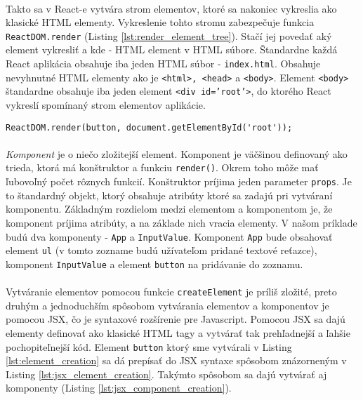 \paragraph{}
Takto sa v React-e vytvára strom elementov, ktoré sa nakoniec vykreslia ako klasické HTML elementy. Vykreslenie tohto stromu zabezpečuje funkcia \texttt{ReactDOM.render} (Listing \ref{lst:render_element_tree}). Stačí jej povedať aký element vykresliť a kde - HTML element v HTML súbore. Štandardne každá React aplikácia obsahuje iba jeden HTML súbor - \texttt{index.html}. Obsahuje nevyhnutné HTML elementy ako je \texttt{<html>, <head>} a \texttt{<body>}. Element \texttt{<body>} štandardne obsahuje iba jeden element \texttt{<div id='root'>}, do ktorého React vykreslí spomínaný strom elementov aplikácie.

\begin{lstlisting}[caption={Vykreslenie elementu do DOM}, label={lst:render_element_tree}]
ReactDOM.render(button, document.getElementById('root'));
\end{lstlisting}

\paragraph{}
\emph{Komponent} je o niečo zložitejší element. Komponent je väčšinou definovaný ako trieda, ktorá má konštruktor a funkciu \texttt{render()}. Okrem toho môže mať ľubovoľný počet rôznych funkcií. Konštruktor príjima jeden parameter \texttt{props}. Je to štandardný objekt, ktorý obsahuje atribúty ktoré sa zadajú pri vytváraní komponentu. Základným rozdielom medzi elementom a komponentom je, že komponent príjima atribúty, a na základe nich vracia elementy. V našom príklade budú dva komponenty - \texttt{App} a \texttt{InputValue}. Komponent \texttt{App} bude obsahovať element \texttt{ul} (v tomto zozname budú užívateľom pridané textové reťazce), komponent \texttt{InputValue} a element \texttt{button} na pridávanie do zoznamu.
\paragraph{}
Vytváranie elementov pomocou funkcie \texttt{createElement} je príliš zložité, preto druhým a jednoduchším spôsobom vytvárania elementov a komponentov je pomocou JSX, čo je syntaxové rozšírenie pre Javascript. Pomocou JSX sa dajú elementy definovať ako klasické HTML tagy a vytvárať tak prehľadnejší a ľahšie pochopiteľnejší kód. Element \texttt{button} ktorý sme vytvárali v Listing \ref{lst:element_creation} sa dá prepísať do JSX syntaxe spôsobom znázorneným v Listing \ref{lst:jsx_element_creation}. Takýmto spôsobom sa dajú vytvárať aj komponenty (Listing \ref{lst:jsx_component_creation}).

